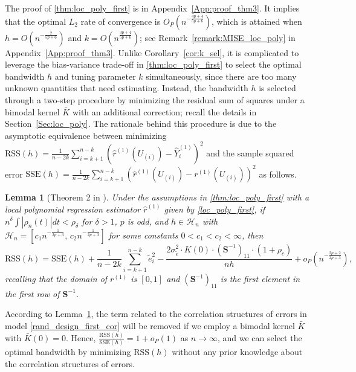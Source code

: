 \documentclass{uwstat572}
\newtheorem{lemma}[theorem]{Lemma}
\theoremstyle{definition}
\renewcommand{\hat}{\widehat}
\renewcommand{\tilde}{\widetilde}
\theoremstyle{theorem}
\begin{document}
\noindent The proof of \autoref{thm:loc_poly_first} is in Appendix~\ref{App:proof_thm3}. It implies that the optimal $L_2$ rate of convergence is $O_P\left(n^{-\frac{4p+4}{5p+6}}\right)$, which is attained when $h=O\left(n^{-\frac{2}{5p+6}}\right)$ and $k=O\left(n^{\frac{3p+4}{5p+6}}\right)$; see Remark~\ref{remark:MISE_loc_poly} in Appendix~\ref{App:proof_thm3}. Unlike Corollary~\ref{cor:k_sel}, it is complicated to leverage the bias-variance trade-off in \autoref{thm:loc_poly_first} to select the optimal bandwidth $h$ and tuning parameter $k$ simultaneously, since there are too many unknown quantities that need estimating. Instead, the bandwidth $h$ is selected through a two-step procedure by minimizing the residual sum of squares under a bimodal kernel $\bar{K}$ with an additional correction; recall the details in Section~\ref{Sec:loc_poly}. The rationale behind this procedure is due to the asymptotic equivalence between minimizing $\mathrm{RSS}(h)=\frac{1}{n-2k} \sum_{i=k+1}^{n-k} \left(\hat{r}^{(1)}(U_{(i)}) -\hat{Y}_i^{(1)} \right)^2$ and the sample squared error $\mathrm{SSE}(h) = \frac{1}{n-2k} \sum_{i=k+1}^{n-k} \left(\hat{r}^{(1)}(U_{(i)}) -r^{(1)}(U_{(i)}) \right)^2$ as follows.

\begin{lemma}[Theorem 2 in \citealt{de2018local}]
\label{lem:RSS_SSE}
Under the assumptions in \autoref{thm:loc_poly_first} with a local polynomial regression estimator $\hat{r}^{(1)}$ given by \eqref{loc_poly_first}, if $n^{\delta} \int |\rho_n(t)| dt < \rho_{\delta}$ for $\delta >1$, $p$ is odd, and $h\in \mathcal{H}_n$ with $\mathcal{H}_n=\left[c_1 n^{-\frac{1}{2p+3}},\, c_2 n^{-\frac{1}{2p+3}}\right]$ for some constants $0<c_1<c_2<\infty$, then
$$\mathrm{RSS}(h) = \mathrm{SSE}(h) + \frac{1}{n-2k} \sum_{i=k+1}^{n-k} \tilde{e}_i^2 - \frac{2\sigma_{\tilde{e}}^2\cdot K(0) \cdot \left(\bm{S}^{-1}\right)_{11}\cdot(1 +\rho_c)}{nh} + o_P\left(n^{-\frac{2p+2}{2p+3}}\right),$$
recalling that the domain of $r^{(1)}$ is $[0,1]$ and $\left(\bm{S}^{-1}\right)_{11}$ is the first element in the first row of $\bm{S}^{-1}$.
\end{lemma}

\noindent According to Lemma~\ref{lem:RSS_SSE}, the term related to the correlation structures of errors in model \eqref{rand_design_first_cor} will be removed if we employ a bimodal kernel $\bar{K}$ with $\bar{K}(0)=0$. Hence, $\frac{\mathrm{RSS}(h)}{\mathrm{SSE}(h)} = 1+o_P(1)$ as $n\to\infty$, and we can select the optimal bandwidth by minimizing $\mathrm{RSS}(h)$ without any prior knowledge about the correlation structures of errors.
\end{document}
